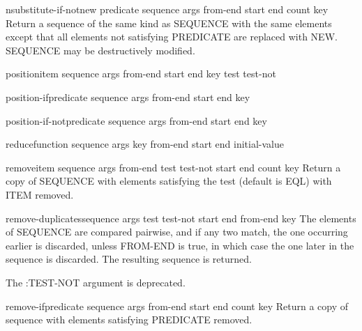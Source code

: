 \begin{function}{nsubstitute-if-not}{new predicate sequence \rest args \key from-end start end count key}
  Return a sequence of the same kind as SEQUENCE with the same elements
   except that all elements not satisfying PREDICATE are replaced with NEW.
   SEQUENCE may be destructively modified.
\end{function}

\begin{function}{position}{item sequence \rest args \key from-end start end key test test-not}
  
\end{function}

\begin{function}{position-if}{predicate sequence \rest args \key from-end start end key}
  
\end{function}

\begin{function}{position-if-not}{predicate sequence \rest args \key from-end start end key}
  
\end{function}

\begin{function}{reduce}{function sequence \rest args \key key from-end start end initial-value}
  
\end{function}

\begin{function}{remove}{item sequence \rest args \key from-end test test-not start end count key}
  Return a copy of SEQUENCE with elements satisfying the test (default is
   EQL) with ITEM removed.
\end{function}

\begin{function}{remove-duplicates}{sequence \rest args \key test test-not start end from-end key}
  The elements of SEQUENCE are compared pairwise, and if any two match,
   the one occurring earlier is discarded, unless FROM-END is true, in
   which case the one later in the sequence is discarded. The resulting
   sequence is returned.

   The :TEST-NOT argument is deprecated.
\end{function}

\begin{function}{remove-if}{predicate sequence \rest args \key from-end start end count key}
  Return a copy of sequence with elements satisfying PREDICATE removed.
\end{function}


